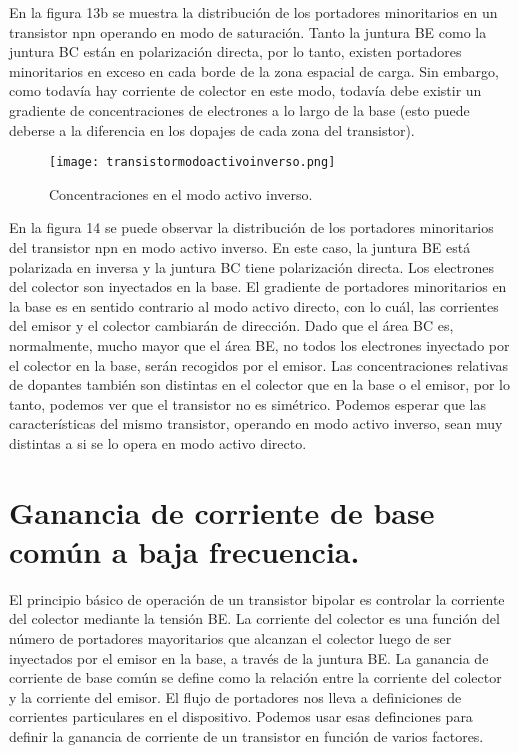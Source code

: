 \documentclass[12pt,a4paper]{article}
\begin{document}
En la figura 13b se muestra la distribución de los portadores minoritarios en un transistor npn operando en modo de saturación. Tanto la juntura BE como la juntura BC están en polarización directa, por lo tanto, existen portadores minoritarios en exceso en cada borde de la zona espacial de carga. Sin embargo, como todavía hay corriente de colector en este modo, todavía debe existir un gradiente de concentraciones de electrones a lo largo de la base (esto puede deberse a la diferencia en los dopajes de cada zona del transistor).

\begin{figure}[ht!]
\begin{center}
\texttt{[image: transistormodoactivoinverso.png]}
\caption{Concentraciones en el modo activo inverso.}
\end{center}
\end{figure}

En la figura 14 se puede observar la distribución de los portadores minoritarios del transistor npn en modo activo inverso. En este caso, la juntura BE está polarizada en inversa y la juntura BC tiene polarización directa. Los electrones del colector son inyectados en la base. El gradiente de portadores minoritarios en la base es en sentido contrario al modo activo directo, con lo cuál, las corrientes del emisor y el colector cambiarán de dirección. Dado que el área BC es, normalmente, mucho mayor que el área BE, no todos los electrones inyectado por el colector en la base, serán recogidos por el emisor. Las concentraciones relativas de dopantes también son distintas en el colector que en la base o el emisor, por lo tanto, podemos ver que el transistor no es simétrico. Podemos esperar que las características del mismo transistor, operando en modo activo inverso, sean muy distintas a si se lo opera en modo activo directo.

\section{Ganancia de corriente de base común a baja frecuencia.}

El principio básico de operación de un transistor bipolar es controlar la corriente del colector mediante la tensión BE. La corriente del colector es una función del número de portadores mayoritarios que alcanzan el colector luego de ser inyectados por el emisor en la base, a través de la juntura BE. La ganancia de corriente de base común se define como la relación entre la corriente del colector y la corriente del emisor. El flujo de portadores nos lleva a definiciones de corrientes particulares en el dispositivo. Podemos usar esas definciones para definir la ganancia de corriente de un transistor en función de varios factores.
\end{document}
